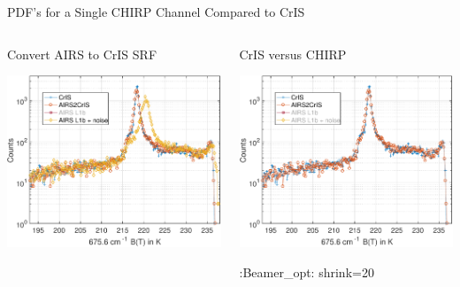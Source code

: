 \documentclass[10pt,t]{beamer}
\begin{document}
\begin{frame}[label={sec:org9631f7f}]{PDF's for a Single CHIRP Channel Compared to CrIS}
\vspace{-0.25in}

\begin{columns}
\begin{column}{0.55\columnwidth}
\begin{block}{\footnotesize Convert AIRS to CrIS SRF}
\vspace{-0.05in}
\vspace{-0.05in}
\begin{center}
\includegraphics[width=0.77\linewidth]{./Figs/Pdf/jun4_2015_airs_675wn_global_counts_w_airsnoise_and_cris_a2c.pdf}
\end{center}
\end{block}
\end{column}

\begin{column}{0.55\columnwidth}
\begin{block}{\footnotesize CrIS versus CHIRP}
\vspace{-0.05in}
\vspace{-0.05in}
\begin{center}
\includegraphics[width=0.77\linewidth]{./Figs/Pdf/jun4_2015_airs_675wn_global_counts_w_airsnoise_and_cris_a2c_no_airs.pdf}
\end{center}

:Beamer\_opt: shrink=20
\end{block}
\end{column}
\end{columns}
\end{frame}
\end{document}
